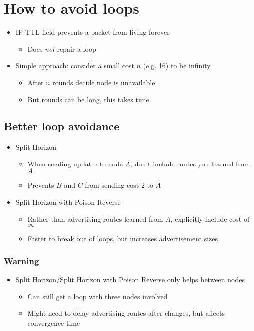 \section{How to avoid loops}
\begin{itemize}[nosep]
    \item IP TTL field prevents a packet from living forever
          \begin{itemize}[nosep]
              \item Does \emph{not} repair a loop
          \end{itemize}
    \item Simple approach: consider a small cost $n$ (e.g. 16) to be infinity
          \begin{itemize}[nosep]
              \item After $n$ rounds decide node is unavailable
              \item But rounds can be long, this takes time
          \end{itemize}
\end{itemize}
\subsection{Better loop avoidance}
\begin{itemize}[nosep]
    \item Split Horizon
          \begin{itemize}[nosep]
              \item When sending updates to node $A$, don't include routes you learned from $A$
              \item Prevents $B$ and $C$ from sending cost 2 to $A$
          \end{itemize}
    \item Split Horizon with Poison Reverse
          \begin{itemize}[nosep]
              \item Rather than advertising routes learned from $A$, explicitly include cost of $\infty$
              \item Faster to break out of loops, but increases advertisement sizes
          \end{itemize}
\end{itemize}
\subsubsection{Warning}
\begin{itemize}[nosep]
    \item Split Horizon/Split Horizon with Poison Reverse only helps between nodes
          \begin{itemize}[nosep]
              \item Can still get a loop with three nodes involved
              \item Might need to delay advertising routes after changes, but affects convergence time
          \end{itemize}
\end{itemize}

